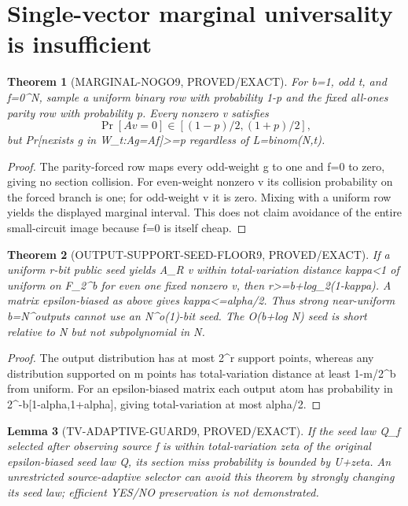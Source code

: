 \documentclass[11pt]{article}
\newtheorem{theorem}{Theorem}
\newtheorem{lemma}[theorem]{Lemma}
\begin{document}
\section*{Single-vector marginal universality is insufficient}
\begin{theorem}[MARGINAL-NOGO9, PROVED/EXACT]
For b=1, odd t, and f=0^N, sample a uniform binary row with probability 1-p and the fixed all-ones parity row with probability p. Every nonzero v satisfies
\[
 \Pr[Av=0]\in[(1-p)/2,(1+p)/2],
\]
but Pr[nexists g in W_t:Ag=Af]>=p regardless of L=binom(N,t).
\end{theorem}
\begin{proof}
The parity-forced row maps every odd-weight g to one and f=0 to zero, giving no section collision. For even-weight nonzero v its collision probability on the forced branch is one; for odd-weight v it is zero. Mixing with a uniform row yields the displayed marginal interval. This does not claim avoidance of the entire small-circuit image because f=0 is itself cheap.
\end{proof}
\begin{theorem}[OUTPUT-SUPPORT-SEED-FLOOR9, PROVED/EXACT]
If a uniform r-bit public seed yields A_R v within total-variation distance kappa<1 of uniform on F_2^b for even one fixed nonzero v, then r>=b+log_2(1-kappa). A matrix epsilon-biased as above gives kappa<=alpha/2. Thus strong near-uniform b=N^\tau outputs cannot use an N^{o(1)}-bit seed. The O(b+log N) seed is short relative to N but not subpolynomial in N.
\end{theorem}
\begin{proof}
The output distribution has at most 2^r support points, whereas any distribution supported on m points has total-variation distance at least 1-m/2^b from uniform. For an epsilon-biased matrix each output atom has probability in 2^{-b}[1-alpha,1+alpha], giving total-variation at most alpha/2.
\end{proof}
\begin{lemma}[TV-ADAPTIVE-GUARD9, PROVED/EXACT]
If the seed law Q_f selected after observing source f is within total-variation zeta of the original epsilon-biased seed law Q, its section miss probability is bounded by U+zeta. An unrestricted source-adaptive selector can avoid this theorem by strongly changing its seed law; efficient YES/NO preservation is not demonstrated.
\end{lemma}
\end{document}
